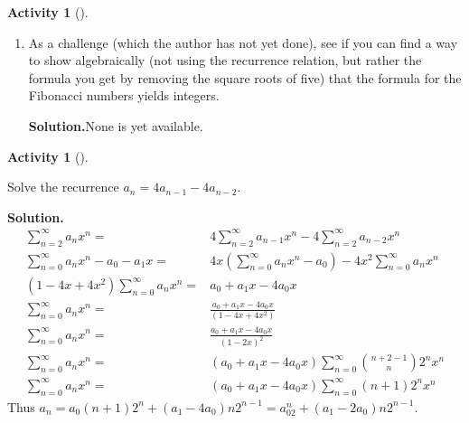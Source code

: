 \documentclass[10pt,]{book}
\theoremstyle{plain}
\theoremstyle{definition}
\newtheorem{activity}[project]{Activity}
\numberwithin{equation}{chapter}
\newcommand{\amp}{&}
\begin{document}
\begin{activity}[]
\begin{enumerate}[label=(\alph*)]
~\par
\item As a challenge (which the author has not yet done), see if you can find a way to show algebraically (not using the recurrence relation, but rather the formula you get by removing the square roots of five) that the formula for the Fibonacci numbers yields integers.%
\par\medskip\noindent%
\textbf{Solution.}\quad None is yet available.%

\end{enumerate}
\end{activity}
\begin{activity}[]\label{activity-195}
\item Solve the recurrence \(a_n= 4a_{n-1} - 4a_{n-2}\).%
\par\medskip\noindent%
\textbf{Solution.}\quad %
\begin{align*}
\sum_{n=2}^\infty a_nx^n  =\amp  4\sum_{n=2}^\infty a_{n-1}x^n -
4\sum_{n=2}^\infty a_{n-2}x^n\\
\sum_{n=0}^\infty a_nx^n -a_0-a_1x  =\amp  4x(\sum_{n=0}^\infty a_{n}x^n
-a_0) - 4x^2\sum_{n=0}^\infty a_{n}x^n\\
(1-4x+4x^2)\sum_{n=0}^\infty a_nx^n   =\amp
a_0+a_1x-4a_0x\\
\sum_{n=0}^\infty a_nx^n =\amp \frac{a_0+a_1x-4a_0x}{(1-4x+4x^2)}\\
\sum_{n=0}^\infty a_nx^n =\amp \frac{a_0+a_1x-4a_0x}{(1-2x)^2}\\
\sum_{n=0}^\infty a_nx^n =\amp (a_0+a_1x-4a_0x)\sum_{n=0}^\infty \binom{n+2-1}{n}
2^nx^n\\
\sum_{n=0}^\infty a_nx^n =\amp (a_0+a_1x-4a_0x)\sum_{n=0}^\infty (n+1)
2^nx^n
\end{align*}
Thus \(a_n=a_0(n+1)2^n
+(a_1-4a_0)n2^{n-1}=a_02^n+(a_1-2a_0)n2^{n-1}\).%
\end{activity}
\typeout{************************************************}
\typeout{************************************************}
\end{document}
